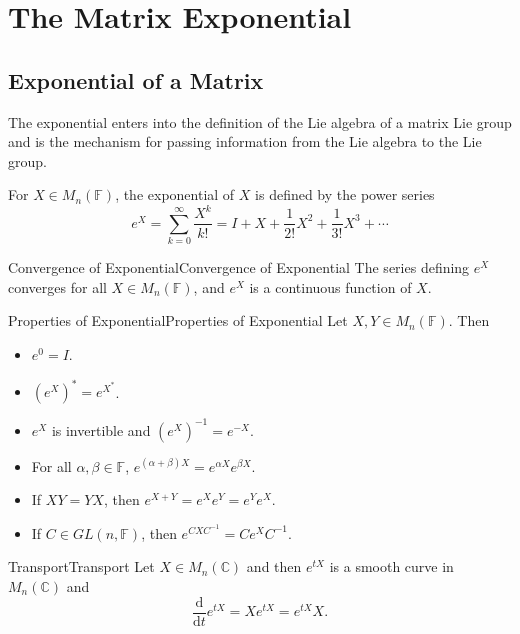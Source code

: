 \documentclass[../main.tex]{subfiles}
\begin{document}
\chapter{The Matrix Exponential}

\section{Exponential of a Matrix}
The exponential enters into the definition of the Lie algebra of a matrix Lie group and is the mechanism for passing information from the Lie algebra to the Lie group.

For $X \in M_n(\mathbb{F})$, the exponential of $X$ is defined by the power series
\begin{equation}
  e^X = \sum_{k=0}^{\infty} \frac{X^k}{k!} = I + X + \frac{1}{2!}X^2 + \frac{1}{3!}X^3 + \cdots
\end{equation}

\begin{proposition}{Convergence of Exponential}{Convergence of Exponential}
  The series defining $e^X$ converges for all $X \in M_n(\mathbb{F})$, and $e^X$ is a continuous function of $X$.
\end{proposition}

\begin{proposition}{Properties of Exponential}{Properties of Exponential}
  Let $X, Y \in M_n(\mathbb{F})$. Then
  \begin{itemize}
    \item $e^0 = I$.
    \item $(e^X)^* = e^{X^*}$.
    \item $e^X$ is invertible and $(e^X)^{-1} = e^{-X}$.
    \item For all $\alpha, \beta \in \mathbb{F}$, $e^{(\alpha + \beta)X} = e^{\alpha X}e^{\beta X}$.
    \item If $XY = YX$, then $e^{X+Y} = e^Xe^Y = e^Ye^X$.
    \item If $C \in GL(n, \mathbb{F})$, then $e^{CXC^{-1}} = Ce^XC^{-1}$.
  \end{itemize}
\end{proposition}

\begin{proposition}{Transport}{Transport}
  Let $X \in M_n(\mathbb{C})$ and then $e^{tX}$ is a smooth curve in $M_n(\mathbb{C})$ and
  \begin{equation}
    \frac{\mathrm{d}}{\mathrm{d} t} e^{tX} = Xe^{tX} = e^{tX}X.
  \end{equation}
\end{proposition}
\end{document}
